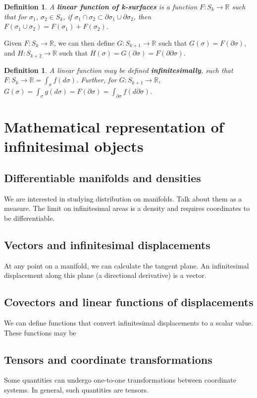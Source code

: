 \documentclass{book}
\newtheorem{defn}[equation]{Definition}
\begin{document}
\begin{defn}
	A \textbf{linear function of k-surfaces} is a function $F : S_k \to \mathbb{R}$ such that for $\sigma_1$, $\sigma_2 \in S_k$, if $\sigma_1 \cap \sigma_2 \subset \partial\sigma_1 \cup \partial\sigma_2$, then $F(\sigma_1\cup\sigma_2) = F(\sigma_1) + F(\sigma_2)$. 
\end{defn}


Given $F : S_k \to \mathbb{R}$, we can then define $G : S_{k+1} \to \mathbb{R}$ such that $G(\sigma) = F(\partial\sigma)$, and $H : S_{k+2} \to \mathbb{R}$ such that $H(\sigma) = G(\partial\sigma) = F(\partial\partial\sigma)$. 

\begin{defn}
	A linear function may be defined \textbf{infinitesimally}, such that $F : S_k \to \mathbb{R} = \int_{\sigma} f(d\sigma)$. Further, for $G : S_{k+1} \to \mathbb{R}$, $G(\sigma) = \int_{\sigma} g(d\sigma) = F(\partial\sigma) = \int_{\partial\sigma}f(d\partial\sigma)$. 
\end{defn}


\chapter{Mathematical representation of infinitesimal objects}

\section{Differentiable manifolds and densities}
We are interested in studying distribution on manifolds. Talk about them as a measure. The limit on infinitesimal areas is a density and requires coordinates to be differentiable.

\section{Vectors and infinitesimal displacements}
At any point on a manifold, we can calculate the tangent plane. An infinitesimal displacement along this plane (a directional derivative) is a vector. 
\section{Covectors and linear functions of displacements}
We can define functions that convert infinitesimal displacements to a scalar value. These functions may be 
\section{Tensors and coordinate transformations}
Some quantities can undergo one-to-one transformations between coordinate systems. In general, such quantities are tensors. 
\end{document}
